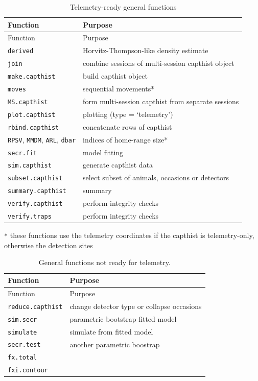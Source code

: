 \documentclass[
]{book}
\begin{document}
\begin{longtable}[]{@{}ll@{}}
\caption{\label{tab:telemetrygeneralfunctions} Telemetry-ready general functions}\tabularnewline
\toprule\noalign{}
Function & Purpose \\
\midrule\noalign{}
\endfirsthead
\toprule\noalign{}
Function & Purpose \\
\midrule\noalign{}
\endhead
\bottomrule\noalign{}
\endlastfoot
\texttt{derived} & Horvitz-Thompson-like density estimate \\
\texttt{join} & combine sessions of multi-session capthist object \\
\texttt{make.capthist} & build capthist object \\
\texttt{moves} & sequential movements* \\
\texttt{MS.capthist} & form multi-session capthist from separate sessions \\
\texttt{plot.capthist} & plotting (type = `telemetry') \\
\texttt{rbind.capthist} & concatenate rows of capthist \\
\texttt{RPSV}, \texttt{MMDM}, \texttt{ARL}, \texttt{dbar} & indices of home-range size* \\
\texttt{secr.fit} & model fitting \\
\texttt{sim.capthist} & generate capthist data \\
\texttt{subset.capthist} & select subset of animals, occasions or detectors \\
\texttt{summary.capthist} & summary \\
\texttt{verify.capthist} & perform integrity checks \\
\texttt{verify.traps} & perform integrity checks \\
\end{longtable}

\texttt{*} these functions use the telemetry coordinates if the capthist is telemetry-only, otherwise the detection sites

\begin{longtable}[]{@{}ll@{}}
\caption{\label{tab:telemetrynonfunctions} General functions not ready for telemetry.}\tabularnewline
\toprule\noalign{}
Function & Purpose \\
\midrule\noalign{}
\endfirsthead
\toprule\noalign{}
Function & Purpose \\
\midrule\noalign{}
\endhead
\bottomrule\noalign{}
\endlastfoot
\texttt{reduce.capthist} & change detector type or collapse occasions \\
\texttt{sim.secr} & parametric bootstrap fitted model \\
\texttt{simulate} & simulate from fitted model \\
\texttt{secr.test} & another parametric boostrap \\
\texttt{fx.total} & \\
\texttt{fxi.contour} & \\
\end{longtable}
\end{document}
